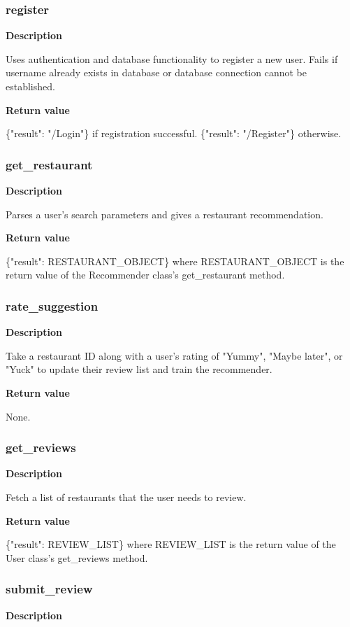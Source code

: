 \documentclass[11pt]{article}
\begin{document}
\subsubsection{register}
\textbf{Description}

Uses authentication and database functionality to register a new user. Fails if username already exists in database or database connection cannot be established.

\textbf{Return value}

\{"result": "/Login"\} if registration successful. \{"result": "/Register"\} otherwise.

\subsubsection{get\_restaurant}
\textbf{Description}

Parses a user's search parameters and gives a restaurant recommendation. 

\textbf{Return value}

\{"result": RESTAURANT\_OBJECT\} where RESTAURANT\_OBJECT is the return value of the Recommender class's get\_restaurant method.

\subsubsection{rate\_suggestion}
\textbf{Description}

Take a restaurant ID along with a user's rating of "Yummy", "Maybe later", or "Yuck" to update their review list and train the recommender.

\textbf{Return value}

None.

\subsubsection{get\_reviews}
\textbf{Description}

Fetch a list of restaurants that the user needs to review.

\textbf{Return value}

\{"result": REVIEW\_LIST\} where REVIEW\_LIST is the return value of the User class's get\_reviews method.

\subsubsection{submit\_review}
\textbf{Description}
\end{document}
